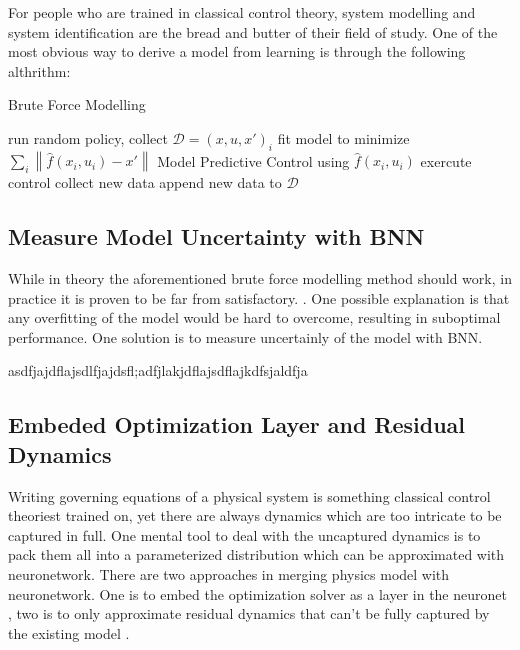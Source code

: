 \documentclass[journal]{IEEEtran}
\begin{document}
For people who are trained in classical control theory, system modelling and system identification are the bread and butter of their field of study. One of the most obvious way to derive a model from learning is through the following althrithm:

\begin{algorithm}
\caption{Brute Force Modelling}
\begin{algorithmic}[1]

    \State run random policy, collect $\mathcal{D}=(x,u,x')_i$
    \State fit model to minimize $\displaystyle \sum_i \left\|\hat{f}(x_i,u_i)-x'\right\|$
    \State Model Predictive Control using $\hat{f}(x_i,u_i)$
    \State exercute control collect new data
    \State append new data to $\mathcal{D}$
    \EndWhile

\end{algorithmic}
\end{algorithm}

\subsection{Measure Model Uncertainty with BNN}

While in theory the aforementioned brute force modelling method should work, in practice it is proven to be far from satisfactory. \cite{8463189}. One possible explanation is that any overfitting of the model would be hard to overcome, resulting in suboptimal performance. One solution is to measure uncertainly of the model with BNN.

asdfjajdflajsdlfjajdsfl;adfjlakjdflajsdflajkdfsjaldfja


\subsection{Embeded Optimization Layer and Residual Dynamics}
Writing governing equations of a physical system is something classical control theoriest trained on, yet there are always dynamics which are too intricate to be captured in full. One mental tool to deal with the uncaptured dynamics is to pack them all into a parameterized distribution which can be approximated with neuronetwork. There are two approaches in merging physics model with neuronetwork. One is to embed the optimization solver as a layer in the neuronet \cite{BelbutePeres2018EndtoEndDP} \cite{BelbutePeres2020CombiningDP} \cite{Agrawal2019DifferentiableCO}, two is to only approximate residual dynamics that can't be fully captured by the existing model \cite{Shi2019NeuralLS}.
\end{document}
